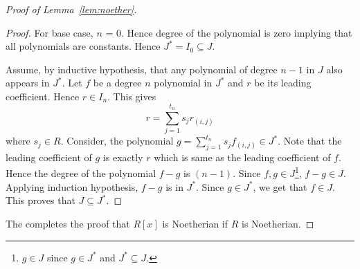 \begin{proof}[Proof of Lemma~\ref{lem:noether}]
\begin{proof}
	For base case, $n$ = 0. Hence degree of the polynomial is zero
	implying that all polynomials are constants. Hence $J^* = I_0
	\subseteq J$. 
	
	Assume, by inductive hypothesis, that any polynomial of degree $n-1$ in
	$J$ also appears in $J^*$. Let $f$ be a degree $n$ polynomial in
	$J^*$ and $r$ be its leading coefficient. Hence $r \in I_n$. This
	gives
	\[ r=\sum_{j=1}^{t_n} s_j r_{(i,j)} \]
	where $s_j \in R$. 
	Consider, the polynomial $g = \sum_{j=1}^{t_n}s_j f_{(i,j)} \in J^*$. 
	Note that the leading coefficient of $g$ is exactly $r$ which is same
	as the leading coefficient of $f$. Hence the degree of the polynomial 
	$f-g$ is $(n-1)$. Since $f,g \in J$\footnote{$g \in J$ since $g \in
	J^*$ and $J^* \subseteq J$.}, $f-g \in J$. Applying 
	induction hypothesis, $f-g$ is in $J^*$. Since $g \in J^*$, we get
	that $f \in J$. This proves that $J \subseteq J^*$. 
\end{proof}
The completes the proof that $R[x]$ is Noetherian if $R$ is Noetherian.
\end{proof}

